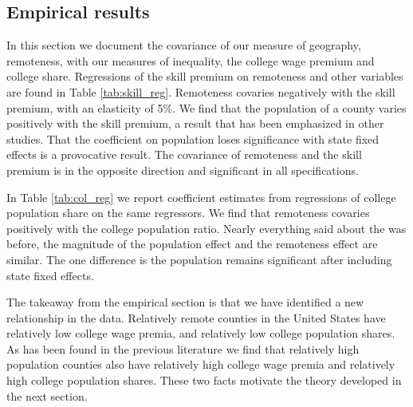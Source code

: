 \documentclass[12 pt]{article}
\begin{document}
\subsection{Empirical results}
In this section we document the covariance of our measure of geography, remoteness, with our measures of inequality, the college wage premium and college share.  Regressions of the skill premium on remoteness and other variables are found in Table \ref{tab:skill_reg}.  Remoteness covaries negatively with the skill premium, with an elasticity of 5\%.  We find that the population of a county varies positively with the skill premium, a result that has been emphasized in other studies.  That the coefficient on population loses significance with state fixed effects is a provocative result.  The covariance of remoteness and the skill premium is in the opposite direction and significant in all specifications.

In Table \ref{tab:col_reg} we report coefficient estimates from regressions of college population share on the same regressors.  We find that remoteness covaries positively with the college population ratio.  Nearly everything said about the was before, the magnitude of the population effect and the remoteness effect are similar.  The one difference is the population remains significant after including state fixed effects.

The takeaway from the empirical section is that we have identified a new relationship in the data.  Relatively remote counties in the United States have relatively low college wage premia, and relatively low college population shares.  As has been found in the previous literature we find that relatively high population counties also have relatively high college wage premia and relatively high college population shares.  These two facts motivate the theory developed in the next section.
\end{document}
